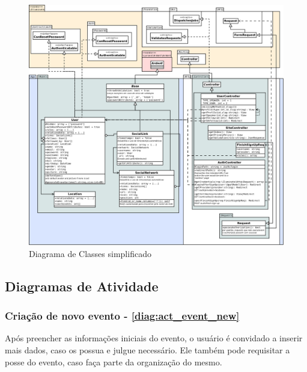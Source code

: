 \documentclass[12pt,a4paper,twoside,hyphens,english,brazil]{abntex2}
\begin{document}
{\begin{figure}[p!]  %
	\centering
	\includegraphics[width=1\linewidth]{diagramas/classes.png}
	\caption{Diagrama de Classes simplificado}
	\label{diag:classes}
\end{figure}

\subsection{Diagramas de Atividade}

\subsubsection*{Criação de novo evento - \autoref{diag:act_event_new}}
Após preencher as informações iniciais do evento, o usuário é convidado a inserir mais dados, caso os possua e julgue necessário. Ele também pode requisitar a posse do evento, caso faça parte da organização do mesmo.

}
\end{document}
